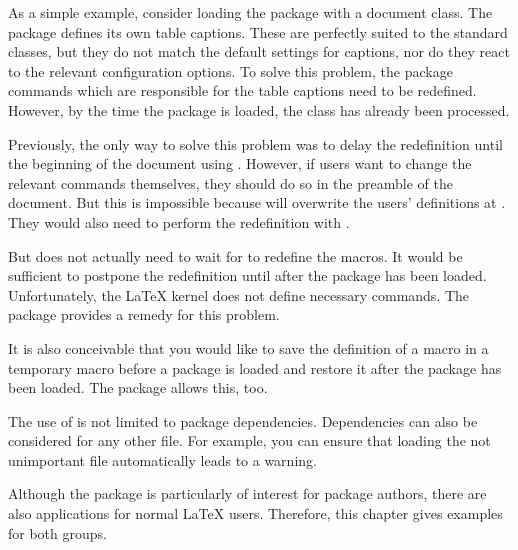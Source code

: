 As a simple example, consider loading the  package with a
\KOMAScript{} document class. The  package defines its own
table captions. These are perfectly suited to the standard classes, but they
do not match the default settings for \KOMAScript{} captions, nor do they
react to the relevant configuration options. To solve this problem, the
 package commands which are responsible for the table
captions need to be redefined. However, by the time the 
package is loaded, the \KOMAScript{} class has already been processed.

Previously, the only way to solve this problem was to delay the redefinition
until the beginning of the document using . However, if
users want to change the relevant commands themselves, they should do so in
the preamble of the document. But this is impossible because \KOMAScript{}
will overwrite the users' definitions at .
They would also need to perform the redefinition with .

But \KOMAScript{} does not actually need to wait for
 to redefine the macros. It would be
sufficient to postpone the redefinition until after the 
package has been loaded. Unfortunately, the \LaTeX{} kernel does not define
necessary commands. The  package provides a remedy for this
problem.

It is also conceivable that you would like to save the definition of a macro
in a temporary macro before a package is loaded and restore it after the
package has been loaded. The  package allows this, too.

The use of  is not limited to package dependencies.
Dependencies can also be considered for any other file.  For example, you can
ensure that loading the not unimportant file  automatically
leads to a warning.

Although the package is particularly of interest for package authors, there
are also applications for normal \LaTeX{} users.  Therefore, this chapter
gives examples for both groups.

